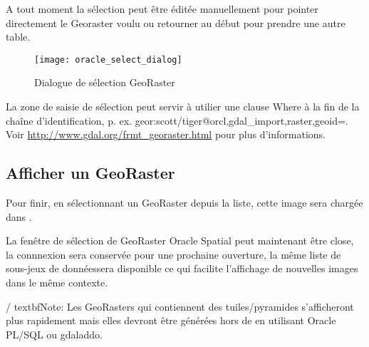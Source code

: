 
A tout moment la sélection peut être éditée manuellement pour pointer directement le Georaster voulu ou retourner au début pour prendre une autre table.

\begin{figure}[ht]
\centering
   
   \texttt{[image: oracle\_select\_dialog]}
   \caption{Dialogue de sélection GeoRaster \nixcaption}\label{fig:oracle_select}
\end{figure}


La zone de saisie de sélection peut servir à utilier une clause Where à la fin de la chaîne d'identification, p. ex. \og geor:scott/tiger@orcl,gdal\_import,raster,geoid=\fg. Voir \url{http://www.gdal.org/frmt_georaster.html} pour plus d'informations.

\subsection{Afficher un GeoRaster}

Pour finir, en sélectionnant un GeoRaster depuis la liste, cette image sera chargée dans \qg.


La fenêtre de sélection de GeoRaster Oracle Spatial peut maintenant être close, la connnexion sera conservée pour une prochaine ouverture, la même liste de sous-jeux de donnéessera disponible ce qui facilite l'affichage de nouvelles images dans le même contexte.

/%
textbf{Note:} Les GeoRasters qui contiennent des tuiles/pyramides s'afficheront plus rapidement mais elles devront être générées hors de \qg en utilisant Oracle PL/SQL ou gdaladdo.

